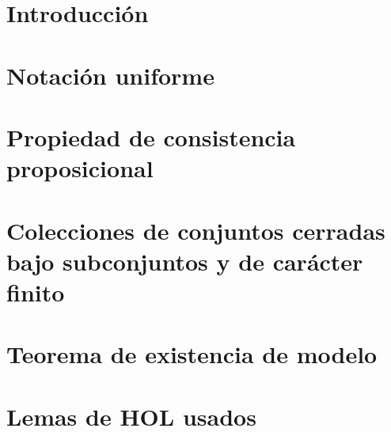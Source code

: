 \documentclass[12pt,a4paper,twoside]{book}
\begin{document}
\chapter*{Introducción}


\chapter{Notación uniforme}


\chapter{Propiedad de consistencia proposicional}


\chapter{Colecciones de conjuntos cerradas bajo subconjuntos y de carácter finito}


\chapter{Teorema de existencia de modelo}


\appendix
\chapter{Lemas de HOL usados}


\nocite{LMF,articulo,automatic,coq,escribir,fitting1996first,gamut,implementation,intro,isar,main,modal,proofsystems,tutorial,notacion,tfg}


\end{document}
